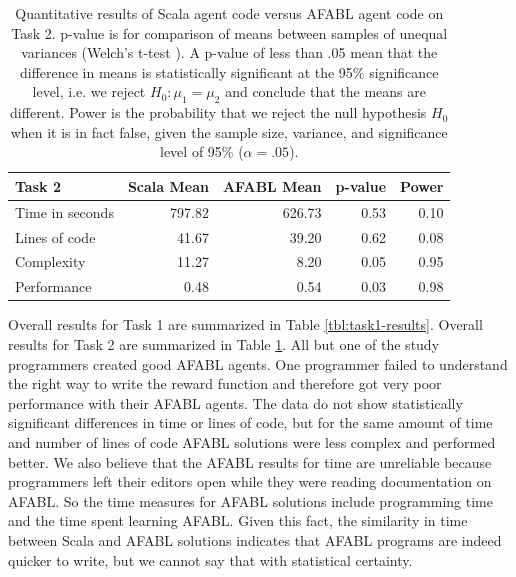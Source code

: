 \begin{center}
\begin{table}[h]
\caption{Quantitative results of Scala agent code versus AFABL agent code on Task 2. p-value is for comparison of means between samples of unequal variances (Welch's t-test \cite{welch1947generalization}). A p-value of less than .05 mean that the difference in means is statistically significant at the 95\% significance level, i.e. we reject $H_0: \mu_1 = \mu_2$ and conclude that the means are different. Power is the probability that we reject the null hypothesis $H_0$ when it is in fact false, given the sample size, variance, and significance level of 95\% ($\alpha = .05$).}

\begin{center}
\begin{tabular}{|l|r|r|r|r|}\hline
Task 2 & Scala Mean & AFABL Mean & p-value & Power \\\hline
Time in seconds & 797.82 & 626.73 & 0.53 & 0.10\\
Lines of code & 41.67 & 39.20 & 0.62 & 0.08\\
Complexity & 11.27 & 8.20 & 0.05 & 0.95\\
Performance & 0.48 & 0.54 & 0.03 & 0.98\\
\hline
\end{tabular}

\end{center}
\label{tbl:task2-results}
\end{table}
\end{center}


Overall results for Task 1 are summarized in Table \ref{tbl:task1-results}. Overall results for Task 2 are summarized in Table \ref{tbl:task2-results}. All but one of the study programmers created good AFABL agents. One programmer failed to understand the right way to write the reward function and therefore got very poor performance with their AFABL agents. The data do not show statistically significant differences in time or lines of code, but for the same amount of time and number of lines of code AFABL solutions were less complex and performed better. We also believe that the AFABL results for time are unreliable because programmers left their editors open while they were reading documentation on AFABL. So the time measures for AFABL solutions include programming time and the time spent learning AFABL. Given this fact, the similarity in time between Scala and AFABL solutions indicates that AFABL programs are indeed quicker to write, but we cannot say that with statistical certainty.

